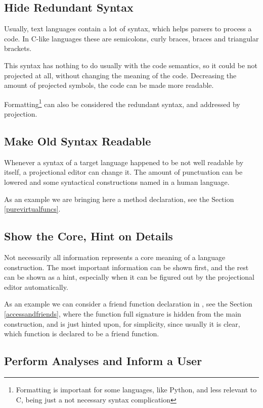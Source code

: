 \subsection{Hide Redundant Syntax}

 Usually, text languages contain a lot of syntax, which helps parsers to process a code. 
 In C-like languages these are semicolons, curly braces, braces and triangular brackets.
 
 This syntax has nothing to do usually with the code semantics, so it could be not projected at all, without changing
 the meaning of the code. Decreasing the amount of projected symbols, the code can be made more readable.
 
 Formatting\footnote{Formatting is important for some languages, like Python, and less relevant to C, being just a not necessary syntax complication} 
 can also be considered the redundant syntax, and addressed by projection.

\subsection{Make Old Syntax Readable}

  Whenever a syntax of a target language happened to be not well readable by itself, a projectional editor can 
  change it. The amount of punctuation can be lowered and some syntactical constructions named in a human language.
  
  As an example we are bringing here a  method declaration, see the Section \ref{purevirtualfuncs}.

\subsection{Show the Core, Hint on Details}

  Not necessarily all information represents a core meaning of a language construction. The 
  most important information can be shown first, and the rest can be shown as a hint, especially when
  it can be figured out by the projectional editor automatically.
  
  As an example we can consider a friend function declaration in \pcpp, see the Section \ref{accessandfriends}, where the function full signature 
  is hidden from the main construction, and is just hinted upon, 
  for simplicity, since usually it is clear, which function is declared to be a friend function.

\subsection{Perform Analyses and Inform a User}
\label{analysisprinciple}

